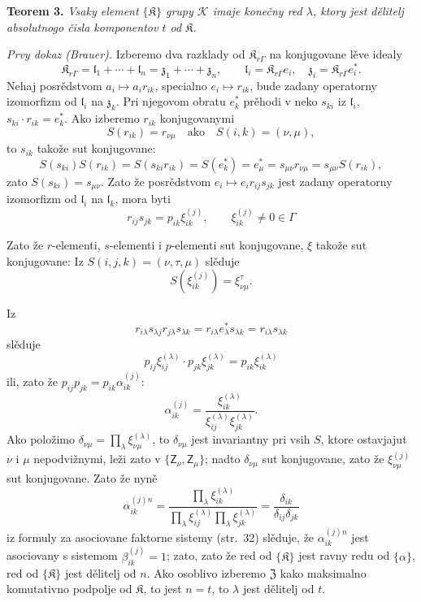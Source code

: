 \documentclass[11pt]{article}
\begin{document}
\textbf{Teorem 3.} \emph{Vsaky element \(\{\mathfrak K\}\) grupy \(\mathscr K\) imaje konečny red \(\lambda\), ktory jest dělitelj absolutnogo čisla komponentov \(t\) od \(\mathfrak K\).}

\emph{Prvy dokaz (Brauer).} Izberemo dva razklady od \(\mathfrak K_{r\Gamma}\) na konjugovane lěve idealy
\[
\mathfrak K_{r\Gamma}=\mathfrak l_1+\cdots+\mathfrak l_n=\mathfrak z_1+\cdots+\mathfrak z_n,\qquad
\mathfrak l_i=\mathfrak K_{r\Gamma}e_i,\quad
\mathfrak z_i=\mathfrak K_{r\Gamma}e_i^*.
\]
Nehaj posrědstvom \(a_i\mapsto a_ir_{ik}\), specialno \(e_i\mapsto r_{ik}\), bude zadany operatorny izomorfizm od \(\mathfrak l_i\) na \(\mathfrak z_k\). Pri njegovom obratu \(e_k^*\) prěhodi v neko \(s_{ki}\) iz \(\mathfrak l_i\), \(s_{ki}\cdot r_{ik}=e_k^*\). Ako izberemo \(r_{ik}\) konjugovanymi
\[
S(r_{ik})=r_{\nu\mu}\quad\text{ako}\quad S(i,k)=(\nu,\mu),
\]
to \(s_{ik}\) takože sut konjugovane:
\[
S(s_{ki})S(r_{ik})=S(s_{ki}r_{ik})=S(e_k^*)=e_\mu^*
=s_{\mu\nu}r_{\nu\mu}=s_{\mu\nu}S(r_{ik}),
\]
zato \(S(s_{ki})=s_{\mu\nu}\). Zato že posrědstvom \(e_i\mapsto e_ir_{ij}s_{jk}\) jest zadany operatorny izomorfizm od \(\mathfrak l_i\) na \(\mathfrak l_k\), mora byti
\[
r_{ij}s_{jk}=p_{ik}\xi_{ik}^{(j)},\qquad
\xi_{ik}^{(j)}\ne0\in\Gamma
\]

Zato že \(r\)-elementi, \(s\)-elementi i \(p\)-elementi sut konjugovane, \(\xi\) takože sut konjugovane: Iz \(S(i,j,k)=(\nu,\tau,\mu)\) slěduje
\[
S(\xi_{ik}^{(j)})=\xi_{\nu\mu}^{\tau}.
\]

Iz
\[
r_{i\lambda}s_{\lambda j}r_{j\lambda}s_{\lambda k}
=r_{i\lambda}e_\lambda^*s_{\lambda k}
=r_{i\lambda}s_{\lambda k}
\]
slěduje
\[
p_{ij}\xi_{ij}^{(\lambda)}\cdot p_{jk}\xi_{jk}^{(\lambda)}
=p_{ik}\xi_{ik}^{(\lambda)}
\]
ili, zato že \(p_{ij}p_{jk}=p_{ik}\alpha_{ik}^{(j)}\):
\[
\alpha_{ik}^{(j)}
=\frac{\xi_{ik}^{(\lambda)}}{\xi_{ij}^{(\lambda)}\xi_{jk}^{(\lambda)}}.
\]
Ako položimo \(\delta_{\nu\mu}=\prod_{\lambda}\xi_{\nu\mu}^{(\lambda)}\), to \(\delta_{\nu\mu}\) jest invariantny pri vsih \(S\), ktore ostavjajut \(\nu\) i \(\mu\) nepodvižnymi, leži zato v \(\{\mathsf{Z}_\nu,\mathsf{Z}_\mu\}\); nadto \(\delta_{\nu\mu}\) sut konjugovane, zato že \(\xi_{\nu\mu}^{(j)}\) sut konjugovane. Zato že nyně
\[
\alpha_{ik}^{(j)n}
=\frac{\prod_{\lambda}\xi_{ik}^{(\lambda)}}
       {\prod_{\lambda}\xi_{ij}^{(\lambda)}\prod_{\lambda}\xi_{jk}^{(\lambda)}}
=\frac{\delta_{ik}}{\delta_{ij}\delta_{jk}}
\]
iz formuly za asociovane faktorne sistemy (str.~32) slěduje, že \(\alpha_{ik}^{(j)n}\) jest asociovany s sistemom \(\beta_{ik}^{(j)}=1\); zato, zato že red od \(\{\mathfrak K\}\) jest ravny redu od \(\{\alpha\}\), red od \(\{\mathfrak K\}\) jest dělitelj od \(n\). Ako osoblivo izberemo \(\mathfrak Z\) kako maksimalno komutativno podpolje od \(\mathfrak K\), to jest \(n=t\), to \(\lambda\) jest dělitelj od \(t\).
\end{document}
